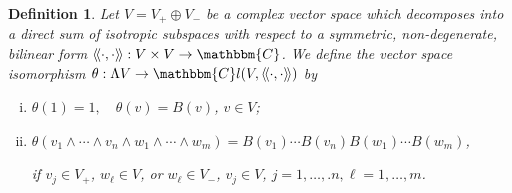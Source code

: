 \documentclass[11pt]{article}
\newcommand{\cdummy}{\cdot}
\newcommand{\llangle}{{\langle\!\langle}}
\newcommand{\rrangle}{{\rangle\!\rangle}}
\newenvironment{enumerateroman}{\begin{enumerate}[i.] }{\end{enumerate}}
\newtheorem{definition}{Definition}
\begin{document}
\begin{definition}
  \label{GPdef:theta-map}Let $V = V_+ \oplus V_-$ be a complex vector space
  which decomposes into a direct sum of isotropic subspaces with respect to a
  symmetric, non-degenerate, bilinear form $\llangle \cdummy, \cdummy \rrangle
  : V \times V \rightarrow \mathbbm{C}$. We define the vector space isomorphism
  $\theta : \Lambda V \rightarrow \mathbbm{C}l (V, \llangle \cdummy, \cdummy
  \rrangle)$ by
  \begin{enumerateroman}
    \item $\theta (1) = 1, \quad \theta (v) = B (v)$, $v \in V$;
    
    \item $\theta (v_1 \wedge \cdots \wedge v_n \wedge w_1 \wedge \cdots
    \wedge w_m) = B (v_1) \cdots B (v_n) B (w_1) \cdots B (w_m)$,
    
    if $v_j \in V_+$, $w_{\ell} \in V$, or $w_{\ell} \in V_-$, $v_j \in V$,
    $j = 1, \ldots, .n, \ell = 1, \ldots, m$.
  \end{enumerateroman}
\end{definition}
\end{document}
